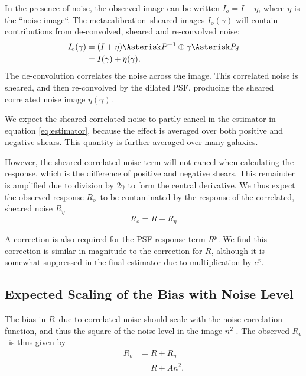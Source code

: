 \documentclass[usegraphicx,usenatbib]{mn2e}
\newcommand{\mcal}{metacalibration}
\newcommand{\mcalR}{$R$}
\newcommand{\mcalRpsf}{$R^{p}$}
\newcommand{\mcalRo}{$R_o$}
\newcommand{\mcalRnoise}{$R_\eta$}
\begin{document}
In the presence of noise, the observed image can be written $I_o=I+\eta$, where $\eta$
is the ``noise image``.  The \mcal\ sheared images $I_o(\gamma)$ will contain
contributions from de-convolved, sheared and re-convolved noise:
\begin{align}
    I_{o}(\gamma) &= (I + \eta) \Asterisk P^{-1} \oplus \gamma \Asterisk P_{d} \nonumber \\
    &= I(\gamma) + \eta(\gamma).
\end{align}
The de-convolution correlates the noise
across the image.  This correlated noise is sheared, and then re-convolved by
the dilated PSF, producing the sheared correlated noise image $\eta(\gamma)$.

We expect the sheared correlated noise to partly cancel in the estimator in
equation \ref{eq:estimator}, because the effect is averaged over both positive
and negative shears. This quantity is further averaged over many galaxies.

However, the sheared correlated noise term will not cancel when calculating the
response, which is the difference of positive and negative shears.  This
remainder is amplified due to division by $2 \gamma$ to form the central
derivative.  We thus expect the observed response \mcalRo\ to be contaminated
by the response of the correlated, sheared noise \mcalRnoise\
\begin{equation}
    \mbox{\mcalRo}  =  R + \mbox{\mcalRnoise}
\end{equation}

A correction is also required for the PSF response term \mcalRpsf.  We find
this correction is similar in magnitude to the correction for \mcalR, although
it is somewhat suppressed in the final estimator due to multiplication by $e^p$.

\subsection{Expected Scaling of the Bias with Noise Level} \label{sec:scaling}

The bias in \mcalR\ due to correlated noise should scale with the 
noise correlation function, and thus the square of the noise level
in the image $n^2$ \citep{HirataCorrNoise}.  The observed \mcalRo\
is thus given by
\begin{align} \label{eq:scaling}
    \mbox{\mcalRo} &= R + \mbox{\mcalRnoise}  \nonumber \\
                   &= R + A n^2.
\end{align}
\end{document}
